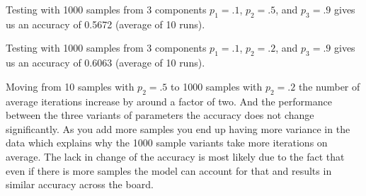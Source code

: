 \documentclass[submit]{harvardml}
\begin{document}
\begin{enumerate}
        Testing with 1000 samples from 3 components $p_1 = .1$, $p_2 = .5$, and $p_3 = .9$ gives us an accuracy of 0.5672 (average of 10 runs).
        
        Testing with 1000 samples from 3 components $p_1 = .1$, $p_2 = .2$, and $p_3 = .9$ gives us an accuracy of 0.6063 (average of 10 runs).
        
        Moving from 10 samples with $p_2 = .5$ to 1000 samples with $p_2 = .2$ the number of average iterations increase by around a factor of two. And the performance between the three variants of parameters the accuracy does not change significantly. As you add more samples you end up having more variance in the data which explains why the 1000 sample variants take more iterations on average. The lack in change of the accuracy is most likely due to the fact that even if there is more samples the model can account for that and results in similar accuracy across the board.
        
        
\end{enumerate}
\newpage
\end{document}
